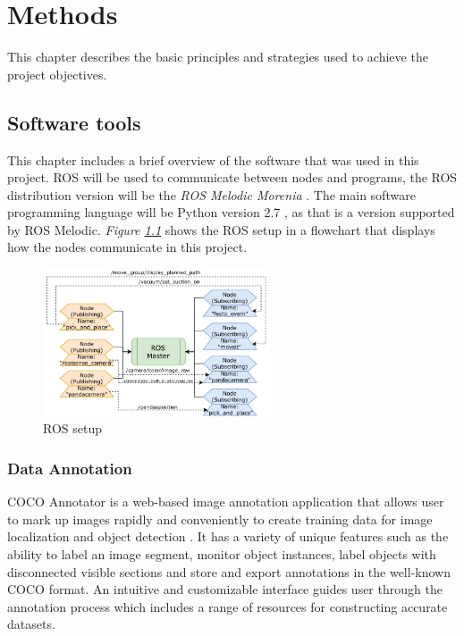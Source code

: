 \chapter{Methods}
This chapter describes the basic principles and strategies used to achieve the project objectives. 
\section{Software tools}

This chapter includes a brief overview of the software that was used in this project. 
ROS will be used to communicate between nodes and programs, the ROS distribution version will be the \textit{ROS Melodic Morenia} \cite{marguedas_ros_2018}. 
The main software programming language will be Python version 2.7 \cite{noauthor_python_nodate}, as that is a version supported by ROS Melodic. \textit{Figure \ref{fig:roswork}} shows the ROS setup in a flowchart that displays how the nodes communicate in this project.
\begin{figure}[h]
 \centering
 \includegraphics[width=0.6\textwidth]{graphics/ros.pdf}
 \caption{ROS setup}
 \label{fig:roswork}
\end{figure}


\subsection{Data Annotation}
COCO Annotator is a web-based image annotation application that allows user to mark up images rapidly and conveniently to create training data for image localization and object detection \cite{brooks_jsbrokscoco-annotator_2021}. It has a variety of unique features such as the ability to label an image segment, monitor object instances, label objects with disconnected visible sections and store and export annotations in the well-known COCO format. An intuitive and customizable interface guides user through the annotation process which includes a range of resources for constructing accurate datasets.

